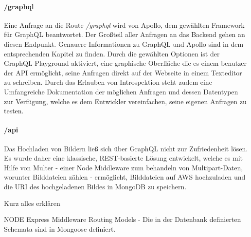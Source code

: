 \paragraph{/graphql}
Eine Anfrage an die Route \textit{/graphql} wird von Apollo, dem gewählten Framework für GraphQL beantwortet. Der Großteil aller Anfragen an das Backend gehen an diesen Endpunkt. Genauere Informationen zu GraphQL und Apollo sind in dem entsprechenden Kapitel zu finden. Durch die gewählten Optionen ist der GraphQL-Playground aktiviert, eine graphische Oberfläche die es einem benutzer der API ermöglicht, seine Anfragen direkt auf der Webseite in einem Texteditor zu schreiben. Durch das Erlauben von Introspektion steht zudem eine Umfangreiche Dokumentation der möglichen Anfragen und dessen Datentypen zur Verfügung, welche es dem Entwickler vereinfachen, seine eigenen Anfragen zu testen.

\paragraph{/api}
Das Hochladen von Bildern ließ sich über GraphQL nicht zur Zufriedenheit lösen. Es wurde daher eine klassische, REST-basierte Lösung entwickelt, welche es mit Hilfe von Multer - einer Node Middleware zum behandeln von Multipart-Daten, worunter Bilddateien zählen - ermöglicht, Bilddateien auf AWS hochzuladen und die URI des hochgeladenen Bildes in MongoDB zu speichern.





Kurz alles erklären

NODE
Express
Middleware
Routing
Models - Die in der Datenbank definierten Schemata sind in Mongoose definiert.